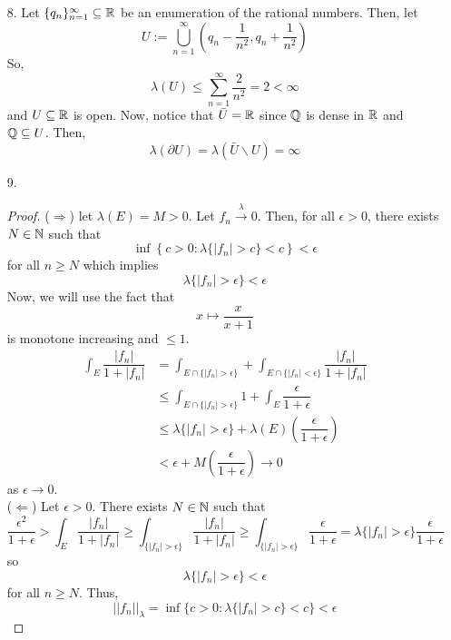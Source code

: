 \begin{itemize}
\item[8.] Let $\{q_n\}_{n=1}^\infty \subseteq \mathbb{R}$ be an enumeration of the rational numbers. Then, let
		\[ U := \bigcup_{n=1}^\infty \left(q_n-\dfrac 1{n^2}, q_n+\dfrac 1{n^2}\right) \]
	So,
		\[ \lambda(U) \le \sum_{n=1}^{\infty} \dfrac{2}{n^2} = 2 < \infty \]
	and $U \subseteq \mathbb{R}$ is open. Now, notice that $\bar U=\mathbb{R}$ since $\mathbb{Q}$ is dense in $\mathbb{R}$ and $\mathbb{Q} \subseteq U$. Then,
		\[ \lambda (\partial U) = \lambda(\bar U \backslash U) = \infty \]


\item[9.] \label{q:w15-9}\begin{proof}
	($\Rightarrow$) let $\lambda(E) = M>0$. Let $f_n \overset{\lambda}{\to} 0$. Then, for all $\epsilon >0$, there exists $N \in \mathbb{N}$ such that
		\[ \inf\left\{ c>0 : \lambda\{|f_n|>c\} < c \right\} < \epsilon \]
	for all $n \ge N$ which implies
		\[ \lambda \{ |f_n| >\epsilon \} < \epsilon \]
	Now, we will use the fact that
		\[ x \mapsto \dfrac x{x+1} \]
	is monotone increasing and $\le 1$.
		\begin{align*}
			\int_E \dfrac{|f_n|}{1+|f_n|} &= \int_{E \cap \{|f_n|>\epsilon\}} + \int_{E \cap \{|f_n|<\epsilon\}} \dfrac{|f_n|}{1+|f_n|} \\
			&\le \int_{E \cap \{|f_n|>\epsilon\}} 1 + \int_{E} \dfrac{\epsilon}{1+\epsilon} \\
			&\le \lambda\{|f_n| > \epsilon\} + \lambda(E)\left(\dfrac{\epsilon}{1+\epsilon}\right) \\
			&< \epsilon + M\left(\dfrac{\epsilon}{1+\epsilon}\right) \to 0
		\end{align*}
	as $\epsilon \to 0$. \\
	($\Leftarrow$) Let $\epsilon >0$. There exists $N \in \mathbb{N}$ such that
		\[ \dfrac{\epsilon^2}{1+\epsilon} > \int_E \dfrac{|f_n|}{1+|f_n|} \ge \int_{\{|f_n|>\epsilon\}}\dfrac{|f_n|}{1+|f_n|} \ge \int_{\{|f_n|>\epsilon\}}\dfrac{\epsilon }{1+\epsilon} = \lambda\{|f_n|>\epsilon \}\dfrac{\epsilon }{1+\epsilon} \]
	so
		\[ \lambda\{|f_n|>\epsilon\} < \epsilon\]
	for all $n \ge N$. Thus,
		\[ ||f_n||_\lambda = \inf\{ c >0 : \lambda\{|f_n|>c\}<c\} <\epsilon \]
\end{proof}


\end{itemize}
